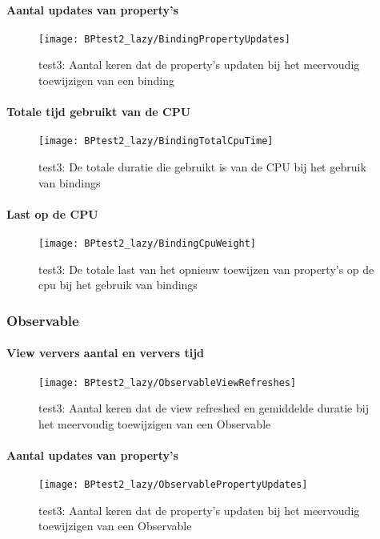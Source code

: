 \paragraph{Aantal updates van property's}
\begin{figure}[H]
    \centering
    \texttt{[image: BPtest2\_lazy/BindingPropertyUpdates]} 
    \caption{test3: Aantal keren dat de property's updaten bij het meervoudig toewijzigen van een binding}
    \label{fig:propertyUpdatesBinding2}
\end{figure}
\paragraph{Totale tijd gebruikt van de CPU}
\begin{figure}[H]
    \centering
    \texttt{[image: BPtest2\_lazy/BindingTotalCpuTime]} 
    \caption{test3: De totale duratie die gebruikt is van de CPU bij het gebruik van bindings}
    \label{fig:cpuUsageTimeBinding2}
\end{figure}
\paragraph{Last op de CPU}
\begin{figure}[H]
    \centering
    \texttt{[image: BPtest2\_lazy/BindingCpuWeight]} 
    \caption{test3: De totale last van het opnieuw toewijzen van property's op de cpu bij het gebruik van bindings}
    \label{fig:cpuWeightBinding2}
\end{figure}

\subsubsection{Observable}
\paragraph{View ververs aantal en ververs tijd}
\begin{figure}[H]
    \centering
    \texttt{[image: BPtest2\_lazy/ObservableViewRefreshes]} 
    \caption{test3: Aantal keren dat de view refreshed en gemiddelde duratie bij het meervoudig toewijzigen van een Observable}
    \label{fig:viewRefreshesObservable2}
\end{figure}
\paragraph{Aantal updates van property's}
\begin{figure}[H]
    \centering
    \texttt{[image: BPtest2\_lazy/ObservablePropertyUpdates]} 
    \caption{test3: Aantal keren dat de property's updaten bij het meervoudig toewijzigen van een Observable}
    \label{fig:propertyUpdatesObservable2}
\end{figure}
